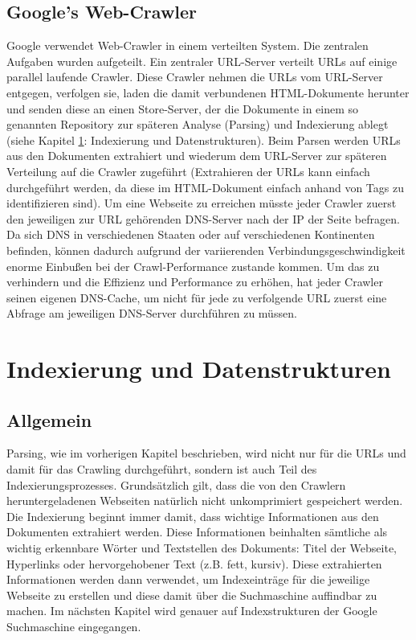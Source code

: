 \documentclass[12pt, a4paper]{llncs}
\begin{document}
	\subsection{Google's Web-Crawler}
	Google verwendet Web-Crawler in einem verteilten System. Die zentralen Aufgaben wurden aufgeteilt. Ein zentraler URL-Server
	verteilt URLs auf einige parallel laufende Crawler. Diese Crawler nehmen die URLs vom URL-Server entgegen, verfolgen sie,
	laden die damit verbundenen HTML-Dokumente herunter und senden diese an einen Store-Server, der die Dokumente in einem so
	genannten Repository zur späteren Analyse (Parsing) und Indexierung ablegt (siehe Kapitel \ref{indexDat}: Indexierung und Datenstrukturen).
	Beim Parsen werden URLs aus den Dokumenten extrahiert und wiederum dem URL-Server zur späteren Verteilung auf die Crawler
	zugeführt (Extrahieren der URLs kann einfach durchgeführt werden, da diese im HTML-Dokument einfach anhand von Tags zu identifizieren
	sind).
	Um eine Webseite zu erreichen müsste jeder Crawler zuerst den jeweiligen zur URL gehörenden DNS-Server nach der IP der Seite befragen.
	Da sich DNS in verschiedenen Staaten oder auf verschiedenen Kontinenten befinden, können dadurch aufgrund der variierenden Verbindungsgeschwindigkeit enorme
	Einbußen bei der Crawl-Performance zustande kommen.
	Um das zu verhindern und die Effizienz und Performance zu erhöhen, hat jeder Crawler seinen eigenen DNS-Cache, um nicht für jede zu verfolgende
	URL zuerst eine Abfrage	am jeweiligen DNS-Server durchführen zu müssen\cite{page98}.
	
	
	
	\section{Indexierung und Datenstrukturen}\label{indexDat}
	\subsection{Allgemein}
	Parsing, wie im vorherigen Kapitel beschrieben, wird nicht nur für die URLs und damit für das Crawling durchgeführt, sondern ist auch Teil
	des Indexierungsprozesses. Grundsätzlich gilt, dass die von den Crawlern heruntergeladenen Webseiten natürlich nicht unkomprimiert gespeichert
	werden. Die Indexierung beginnt immer damit, dass wichtige Informationen aus den Dokumenten extrahiert werden. Diese Informationen beinhalten
	sämtliche als wichtig erkennbare Wörter und Textstellen des Dokuments: Titel der Webseite, Hyperlinks oder hervorgehobener Text (z.B. fett, kursiv).
	Diese extrahierten Informationen werden dann verwendet, um Indexeinträge für die jeweilige Webseite zu erstellen und diese damit über die Suchmaschine
	auffindbar zu machen\cite{langville11}.\newline
	Im nächsten Kapitel wird genauer auf Indexstrukturen der Google Suchmaschine eingegangen.
	
\end{document}
